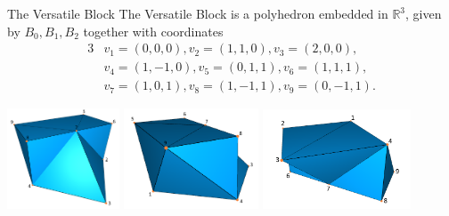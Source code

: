 \documentclass{beamer}
\numberwithin{equation}{aufgabe}
\newcommand\R{\mathbb R}
\begin{document}
\begin{frame}{The Versatile Block}
    The Versatile Block is a polyhedron embedded in $\R^3$, given by $B_0, B_1, B_2$ together with coordinates
    \begin{alignat*}{3}
    &v_1 = (0, 0, 0) , v_2 = (1, 1, 0) ,  v_3 = (2, 0, 0) , \\
    &v_4 = (1, -1, 0) , v_5 = (0, 1, 1) ,  v_6 = (1, 1, 1) ,  \\
    &v_7 = (1, 0, 1) , v_8 = (1, -1, 1) , v_9 = (0, -1, 1).
    \end{alignat*} 
    \pause
    \begin{center}    
        \includegraphics[width=0.25\textwidth]{images/versatile-front.png}
        \pause
        \includegraphics[width=0.3\textwidth]{images/versatile-back.png}
        \pause
        \includegraphics[width=0.33\textwidth]{images/versatile-square.png}
    \end{center}
\end{frame}
\end{document}
